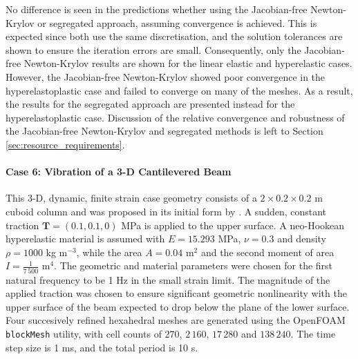 \documentclass[sn-mathphys,Numbered]{sn-jnl}%
\newcommand{\bb}{\boldsymbol}
\begin{document}
No difference is seen in the predictions whether using the Jacobian-free Newton-Krylov or segregated approach, assuming convergence is achieved.
This is expected since both use the same discretisation, and the solution tolerances are shown to ensure the iteration errors are small.
Consequently, only the Jacobian-free Newton-Krylov results are shown for the linear elastic and hyperelastic cases.
However, the Jacobian-free Newton-Krylov showed poor convergence in the hyperelastoplastic case and failed to converge on many of the meshes.
As a result, the results for the segregated approach are presented instead for the hyperelastoplastic case.
Discussion of the relative convergence and robustness of the Jacobian-free Newton-Krylov and segregated methods is left to Section \ref{sec:resource_requirements}.



\paragraph{Case 6: Vibration of a 3-D Cantilevered Beam}
This 3-D, dynamic, finite strain case geometry consists of a $2 \times 0.2 \times 0.2$ m cuboid column and was proposed in its initial form by \citet{Tukovic2007}.
A sudden, constant traction $\bb{T} = \left(0.1, 0.1, 0 \right)$ MPa is applied to the upper surface.
A neo-Hookean hyperelastic material is assumed with $E = 15.293$ MPa, $\nu = 0.3$ and density $\rho = 1000$ kg m$^{-3}$, while the area $A = 0.04$ m$^2$ and the second moment of area $I = \frac{1}{7\,500}$ m$^4$. %
The geometric and material parameters were chosen for the first natural frequency to be 1 Hz in the small strain limit.
The magnitude of the applied traction was chosen to ensure significant geometric nonlinearity with the upper surface of the beam expected to drop below the plane of the lower surface.
Four succesively refined hexahedral meshes are generated using the OpenFOAM \texttt{blockMesh} utility, with cell counts of 270, $2\,160$, $17\,280$ and $138\,240$.
The time step size is 1 ms, and the total period is 10 s.
\end{document}
